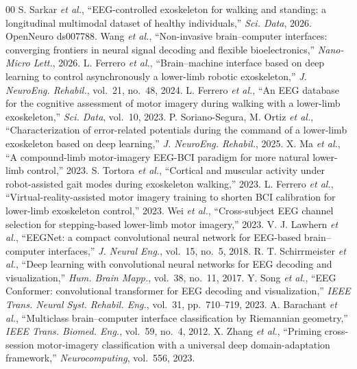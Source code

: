 \documentclass[journal]{IEEEtran}
\begin{document}
\begin{thebibliography}{00}
 S. Sarkar \emph{et al.}, ``EEG-controlled exoskeleton for
walking and standing: a longitudinal multimodal dataset of healthy individuals,''
\emph{Sci. Data}, 2026. OpenNeuro ds007788.
 Wang \emph{et al.}, ``Non-invasive brain--computer interfaces:
converging frontiers in neural signal decoding and flexible bioelectronics,''
\emph{Nano-Micro Lett.}, 2026.
 L. Ferrero \emph{et al.}, ``Brain--machine interface based on
deep learning to control asynchronously a lower-limb robotic exoskeleton,''
\emph{J. NeuroEng. Rehabil.}, vol.~21, no.~48, 2024.
 L. Ferrero \emph{et al.}, ``An EEG database for the cognitive
assessment of motor imagery during walking with a lower-limb exoskeleton,''
\emph{Sci. Data}, vol.~10, 2023.
 P. Soriano-Segura, M. Ortiz \emph{et al.}, ``Characterization
of error-related potentials during the command of a lower-limb exoskeleton based on
deep learning,'' \emph{J. NeuroEng. Rehabil.}, 2025.
 X. Ma \emph{et al.}, ``A compound-limb motor-imagery EEG-BCI
paradigm for more natural lower-limb control,'' 2023.
 S. Tortora \emph{et al.}, ``Cortical and muscular activity
under robot-assisted gait modes during exoskeleton walking,'' 2023.
 L. Ferrero \emph{et al.}, ``Virtual-reality-assisted motor
imagery training to shorten BCI calibration for lower-limb exoskeleton control,''
2023.
 Wei \emph{et al.}, ``Cross-subject EEG channel selection for
stepping-based lower-limb motor imagery,'' 2023.
 V. J. Lawhern \emph{et al.}, ``EEGNet: a compact convolutional
neural network for EEG-based brain--computer interfaces,'' \emph{J. Neural Eng.},
vol.~15, no.~5, 2018.
 R. T. Schirrmeister \emph{et al.}, ``Deep learning with
convolutional neural networks for EEG decoding and visualization,'' \emph{Hum. Brain
Mapp.}, vol.~38, no.~11, 2017.
 Y. Song \emph{et al.}, ``EEG Conformer: convolutional transformer
for EEG decoding and visualization,'' \emph{IEEE Trans. Neural Syst. Rehabil. Eng.},
vol.~31, pp.~710--719, 2023.
 A. Barachant \emph{et al.}, ``Multiclass brain--computer
interface classification by Riemannian geometry,'' \emph{IEEE Trans. Biomed. Eng.},
vol.~59, no.~4, 2012.
 X. Zhang \emph{et al.}, ``Priming cross-session motor-imagery
classification with a universal deep domain-adaptation framework,''
\emph{Neurocomputing}, vol.~556, 2023.

\end{thebibliography}
\end{document}
